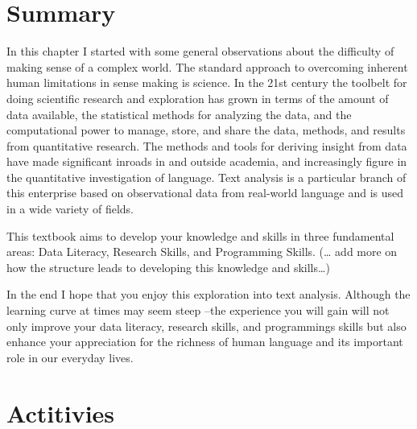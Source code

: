 \documentclass[
  letterpaper,
]{latex/krantz}
\begin{document}
\hypertarget{summary-1}{%
\section*{Summary}\label{summary-1}}


In this chapter I started with some general observations about the
difficulty of making sense of a complex world. The standard approach to
overcoming inherent human limitations in sense making is science. In the
21st century the toolbelt for doing scientific research and exploration
has grown in terms of the amount of data available, the statistical
methods for analyzing the data, and the computational power to manage,
store, and share the data, methods, and results from quantitative
research. The methods and tools for deriving insight from data have made
significant inroads in and outside academia, and increasingly figure in
the quantitative investigation of language. Text analysis is a
particular branch of this enterprise based on observational data from
real-world language and is used in a wide variety of fields.

This textbook aims to develop your knowledge and skills in three
fundamental areas: Data Literacy, Research Skills, and Programming
Skills. (\ldots{} add more on how the structure leads to developing this
knowledge and skills\ldots)

In the end I hope that you enjoy this exploration into text analysis.
Although the learning curve at times may seem steep --the experience you
will gain will not only improve your data literacy, research skills, and
programmings skills but also enhance your appreciation for the richness
of human language and its important role in our everyday lives.

\hypertarget{actitivies}{%
\section*{Actitivies}\label{actitivies}}

\end{document}
